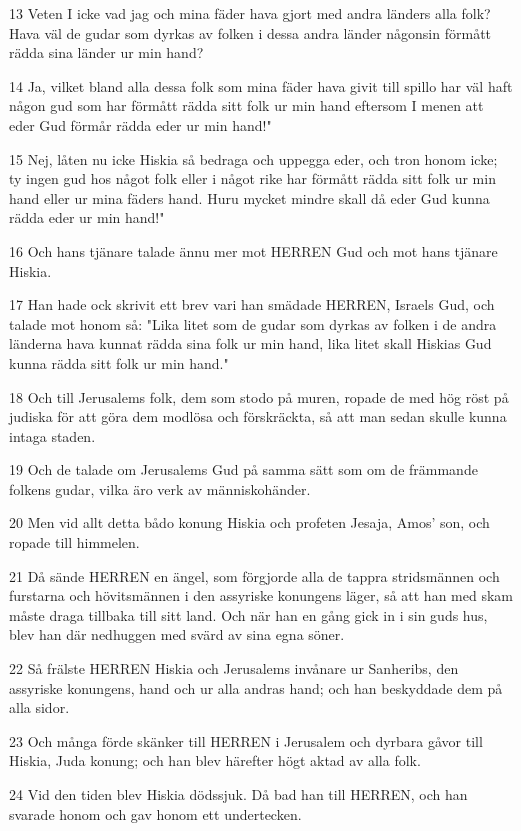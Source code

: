 \par 13 Veten I icke vad jag och mina fäder hava gjort med andra länders alla folk? Hava väl de gudar som dyrkas av folken i dessa andra länder någonsin förmått rädda sina länder ur min hand?
\par 14 Ja, vilket bland alla dessa folk som mina fäder hava givit till spillo har väl haft någon gud som har förmått rädda sitt folk ur min hand eftersom I menen att eder Gud förmår rädda eder ur min hand!"
\par 15 Nej, låten nu icke Hiskia så bedraga och uppegga eder, och tron honom icke; ty ingen gud hos något folk eller i något rike har förmått rädda sitt folk ur min hand eller ur mina fäders hand. Huru mycket mindre skall då eder Gud kunna rädda eder ur min hand!"
\par 16 Och hans tjänare talade ännu mer mot HERREN Gud och mot hans tjänare Hiskia.
\par 17 Han hade ock skrivit ett brev vari han smädade HERREN, Israels Gud, och talade mot honom så: "Lika litet som de gudar som dyrkas av folken i de andra länderna hava kunnat rädda sina folk ur min hand, lika litet skall Hiskias Gud kunna rädda sitt folk ur min hand."
\par 18 Och till Jerusalems folk, dem som stodo på muren, ropade de med hög röst på judiska för att göra dem modlösa och förskräckta, så att man sedan skulle kunna intaga staden.
\par 19 Och de talade om Jerusalems Gud på samma sätt som om de främmande folkens gudar, vilka äro verk av människohänder.
\par 20 Men vid allt detta bådo konung Hiskia och profeten Jesaja, Amos' son, och ropade till himmelen.
\par 21 Då sände HERREN en ängel, som förgjorde alla de tappra stridsmännen och furstarna och hövitsmännen i den assyriske konungens läger, så att han med skam måste draga tillbaka till sitt land. Och när han en gång gick in i sin guds hus, blev han där nedhuggen med svärd av sina egna söner.
\par 22 Så frälste HERREN Hiskia och Jerusalems invånare ur Sanheribs, den assyriske konungens, hand och ur alla andras hand; och han beskyddade dem på alla sidor.
\par 23 Och många förde skänker till HERREN i Jerusalem och dyrbara gåvor till Hiskia, Juda konung; och han blev härefter högt aktad av alla folk.
\par 24 Vid den tiden blev Hiskia dödssjuk. Då bad han till HERREN, och han svarade honom och gav honom ett undertecken.
